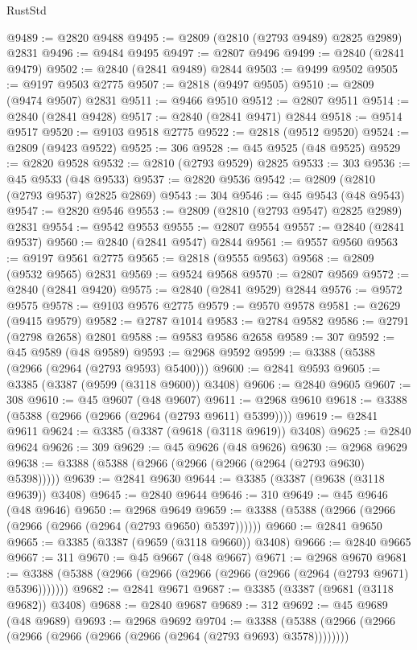 \begin{lexlean}{RustStd}
\begin{coremodule}
@9489 := @2820 @9488
@9495 := @2809 (@2810 (@2793 @9489) @2825 @2989) @2831
@9496 := @9484 @9495
@9497 := @2807 @9496
@9499 := @2840 (@2841 @9479)
@9502 := @2840 (@2841 @9489) @2844
@9503 := @9499 @9502
@9505 := @9197 @9503 @2775
@9507 := @2818 (@9497 @9505)
@9510 := @2809 (@9474 @9507) @2831
@9511 := @9466 @9510
@9512 := @2807 @9511
@9514 := @2840 (@2841 @9428)
@9517 := @2840 (@2841 @9471) @2844
@9518 := @9514 @9517
@9520 := @9103 @9518 @2775
@9522 := @2818 (@9512 @9520)
@9524 := @2809 (@9423 @9522)
@9525 := 306
@9528 := @45 @9525 (@48 @9525)
@9529 := @2820 @9528
@9532 := @2810 (@2793 @9529) @2825
@9533 := 303
@9536 := @45 @9533 (@48 @9533)
@9537 := @2820 @9536
@9542 := @2809 (@2810 (@2793 @9537) @2825 @2869)
@9543 := 304
@9546 := @45 @9543 (@48 @9543)
@9547 := @2820 @9546
@9553 := @2809 (@2810 (@2793 @9547) @2825 @2989) @2831
@9554 := @9542 @9553
@9555 := @2807 @9554
@9557 := @2840 (@2841 @9537)
@9560 := @2840 (@2841 @9547) @2844
@9561 := @9557 @9560
@9563 := @9197 @9561 @2775
@9565 := @2818 (@9555 @9563)
@9568 := @2809 (@9532 @9565) @2831
@9569 := @9524 @9568
@9570 := @2807 @9569
@9572 := @2840 (@2841 @9420)
@9575 := @2840 (@2841 @9529) @2844
@9576 := @9572 @9575
@9578 := @9103 @9576 @2775
@9579 := @9570 @9578
@9581 := @2629 (@9415 @9579)
@9582 := @2787 @1014
@9583 := @2784 @9582
@9586 := @2791 (@2798 @2658) @2801
@9588 := @9583 @9586 @2658
@9589 := 307
@9592 := @45 @9589 (@48 @9589)
@9593 := @2968 @9592
@9599 := @3388 (@5388 (@2966 (@2964 (@2793 @9593) @5400)))
@9600 := @2841 @9593
@9605 := @3385 (@3387 (@9599 (@3118 @9600)) @3408)
@9606 := @2840 @9605
@9607 := 308
@9610 := @45 @9607 (@48 @9607)
@9611 := @2968 @9610
@9618 := @3388 (@5388 (@2966 (@2966 (@2964 (@2793 @9611) @5399))))
@9619 := @2841 @9611
@9624 := @3385 (@3387 (@9618 (@3118 @9619)) @3408)
@9625 := @2840 @9624
@9626 := 309
@9629 := @45 @9626 (@48 @9626)
@9630 := @2968 @9629
@9638 := @3388 (@5388 (@2966 (@2966 (@2966 (@2964 (@2793 @9630) @5398)))))
@9639 := @2841 @9630
@9644 := @3385 (@3387 (@9638 (@3118 @9639)) @3408)
@9645 := @2840 @9644
@9646 := 310
@9649 := @45 @9646 (@48 @9646)
@9650 := @2968 @9649
@9659 := @3388 (@5388 (@2966 (@2966 (@2966 (@2966 (@2964 (@2793 @9650) @5397))))))
@9660 := @2841 @9650
@9665 := @3385 (@3387 (@9659 (@3118 @9660)) @3408)
@9666 := @2840 @9665
@9667 := 311
@9670 := @45 @9667 (@48 @9667)
@9671 := @2968 @9670
@9681 := @3388 (@5388 (@2966 (@2966 (@2966 (@2966 (@2966 (@2964 (@2793 @9671) @5396)))))))
@9682 := @2841 @9671
@9687 := @3385 (@3387 (@9681 (@3118 @9682)) @3408)
@9688 := @2840 @9687
@9689 := 312
@9692 := @45 @9689 (@48 @9689)
@9693 := @2968 @9692
@9704 := @3388 (@5388 (@2966 (@2966 (@2966 (@2966 (@2966 (@2966 (@2964 (@2793 @9693) @3578))))))))

\end{coremodule}
\end{lexlean}
